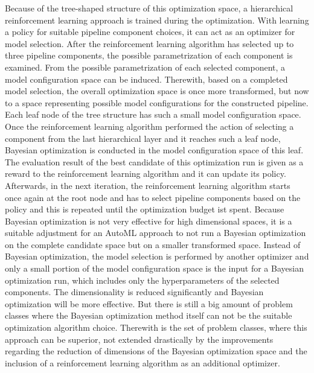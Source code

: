 Because of the tree-shaped structure of this optimization space, a hierarchical reinforcement learning approach is trained during the optimization.
With learning a policy for suitable pipeline component choices, it can act as an optimizer for model selection.\newline
After the reinforcement learning algorithm has selected up to three pipeline components, the possible parametrization of each component is examined.
From the possible parametrization of each selected component, a model configuration space can be induced.
Therewith, based on a completed model selection, the overall optimization space is once more transformed, but now to a space representing possible model configurations for the constructed pipeline.
Each leaf node of the tree structure has such a small model configuration space.\newline
Once the reinforcement learning algorithm performed the action of selecting a component from the last hierarchical layer and it reaches such a leaf node, Bayesian optimization is conducted in the model configuration space of this leaf.
The evaluation result of the best candidate of this optimization run is given as a reward to the reinforcement learning algorithm and it can update its policy.
Afterwards, in the next iteration, the reinforcement learning algorithm starts once again at the root node and has to select pipeline components based on the policy and this is repeated until the optimization budget ist spent.\newline
Because Bayesian optimization is not very effective for high dimensional spaces, it is a suitable adjustment for an AutoML approach to not run a Bayesian optimization on the complete candidate space but on a smaller transformed space.
Instead of Bayesian optimization, the model selection is performed by another optimizer and only a small portion of the model configuration space is the input for a Bayesian optimization run, which includes only the hyperparameters of the selected components.
The dimensionality is reduced significantly and Bayesian optimization will be more effective.\newline
But there is still a big amount of problem classes where the Bayesian optimization method itself can not be the suitable optimization algorithm choice.
Therewith is the set of problem classes, where this approach can be superior, not extended drastically by the improvements regarding the reduction of dimensions of the Bayesian optimization space and the inclusion of a reinforcement learning algorithm as an additional optimizer.

